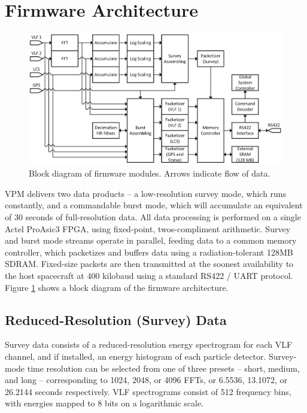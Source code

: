 \section{Firmware Architecture}
\begin{figure}[t]
\begin{center}
\includegraphics[width=35pc]{figures/vpm_figures/firmware_diagram_v2.png}

\caption[Block diagram of VPM firmware modules]{Block diagram of firmware modules. Arrows indicate flow of data.}
\label{fig:firmware_arch}
\end{center}
\end{figure}
VPM delivers two data products -- a low-resolution survey mode, which runs constantly, and a commandable burst mode, which will accumulate an equivalent of 30 seconds of full-resolution data. All data processing is performed on a single Actel ProAsic3 FPGA, using fixed-point, twos-compliment arithmetic. Survey and burst mode streams operate in parallel, feeding data to a common memory controller, which packetizes and buffers data using a radiation-tolerant 128MB SDRAM. Fixed-size packets are then transmitted at the soonest availability to the host spacecraft at 400 kilobaud using a standard RS422 / UART protocol. Figure \ref{fig:firmware_arch} shows a block diagram of the firmware architecture.


\subsection{Reduced-Resolution (Survey) Data}
Survey data consists of a reduced-resolution energy spectrogram for each VLF channel, and if installed, an energy histogram of each particle detector. Survey-mode time resolution can be selected from one of three presets -- short, medium, and long -- corresponding to 1024, 2048, or 4096 FFTs, or 6.5536, 13.1072, or 26.2144 seconds respectively. VLF spectrograms consist of 512 frequency bins, with energies mapped to 8 bits on a logarithmic scale.

